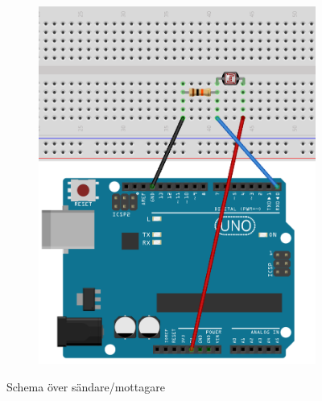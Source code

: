 \begin{figure}
\begin{subfigure}{0.4\textwidth}
            \includegraphics[width=\textwidth]{res/img/resistor}    
        \end{subfigure}
        
        \caption{Schema över sändare/mottagare}\label{fig:schem}
    \end{figure}
